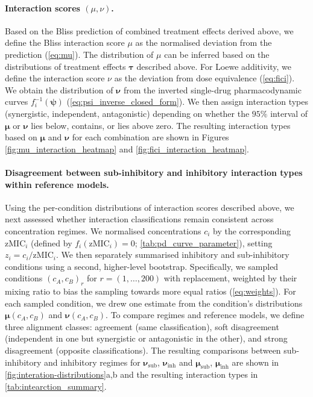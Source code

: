\paragraph{Interaction scores $(\mu, \nu)$.}
Based on the Bliss prediction  of combined treatment effects derived above, we define the Bliss interaction score \(\mu\) as the normalised deviation from the prediction (\autoref{eq:mu}).
The distribution of \(\mu\) can be inferred based on the distributions of treatment effects $\symbf{\tau}$ described above.
For Loewe additivity, we define the interaction score \(\nu\) as the deviation from dose equivalence (\autoref{eq:fici}).
We obtain the distribution of \(\symbf{\nu}\) from the inverted single-drug pharmacodynamic curves \(f_i^{-1}(\symbf{\psi})\) (\autoref{eq:psi_inverse_closed_form}).
We then assign interaction types (synergistic, independent, antagonistic) depending on whether the \(95\%\) interval of \(\symbf{\mu}\) or \(\symbf{\nu}\) lies below, contains, or lies above zero.
The resulting interaction types based on  \(\symbf{\mu}\) and \(\symbf{\nu}\) for each combination are shown in Figures \ref{fig:mu_interaction_heatmap} and \ref{fig:fici_interaction_heatmap}.

\paragraph{Disagreement between sub-inhibitory and inhibitory interaction types within reference models.}
Using the per-condition distributions of interaction scores described above, we next assessed whether interaction classifications remain consistent across concentration regimes.
We normalised concentrations \(c_i\) by the corresponding \(\mathrm{zMIC}_i\) (defined by \(f_i(\mathrm{zMIC}_i) =0\); \autoref{tab:pd_curve_parameter}), setting \(z_i=c_i/\mathrm{zMIC}_i\).
We then separately summarised inhibitory and sub-inhibitory conditions using a second, higher-level bootstrap.
Specifically, we sampled conditions \((c_A,c_B)_r\) for \(r=(1,\dots,200)\) with replacement, weighted by their mixing ratio to bias the sampling towards more equal ratios (\autoref{eq:weights}).
For each sampled condition, we drew one estimate from the condition's distributions \(\symbf{\mu}(c_A,c_B)\) and \(\symbf{\nu}(c_A,c_B)\).
To compare regimes and reference models, we define three alignment classes: agreement (same classification), soft disagreement (independent in one but synergistic or antagonistic in the other), and strong disagreement (opposite classifications).
The resulting comparisons between sub-inhibitory and inhibitory regimes for \(\symbf{\nu}_{\mathrm{sub}}\), \(\symbf{\nu}_{\mathrm{inh}}\) and \(\symbf{\mu}_{\mathrm{sub}}\), \(\symbf{\mu}_{\mathrm{inh}}\) are shown in \autoref{fig:interation-distributions}a,b and the resulting interaction types in \autoref{tab:intearction_summary}.

